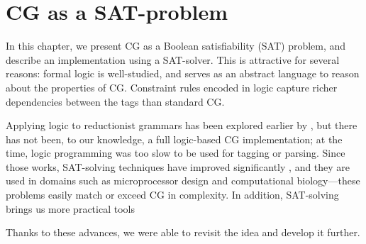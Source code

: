 \def\la{\text{\em la}}
\def\casa{\text{\em casa}}
\def\grande{\text{\em grande}}

\def\det{{\text{\sc Det}}}
\def\prn{{\text{\sc  Prn}}}
\def\n{{\text{\sc N}}}
\def\v{{\text{\sc V}}}
\def\adj{{\text{\sc Adj}}}

\def\laDet{\la_\det}
\def\laPrn{\la_\prn}
\def\casaN{\casa_\n}
\def\casaV{\casa_\v}
\def\grandeAdj{\grande_\adj}

\def\t#1{\texttt{#1}}
\def\ob#1{\overbrace{ #1 \rule{0pt}{2ex}}}
\def\cgrule#1{{\ttfamily #1}}

\def\defRule{``do not remove the last reading''}


\chapter{CG as a SAT-problem}
\label{chapterCGSAT}

In this chapter, we present CG as a Boolean satisfiability (SAT) problem,
and describe an implementation using a SAT-solver. 
This is attractive for several reasons: formal logic is
well-studied, and serves as an abstract language to reason about the
properties of CG. Constraint rules encoded in logic capture richer
dependencies between the tags than standard CG. 



Applying logic to reductionist grammars has been explored earlier by \cite{lager98,lager_nivre01}, but there has not been, to our knowledge, a full logic-based CG implementation; at the time, logic programming was too slow to be used for tagging or parsing. 
Since those works, SAT-solving techniques have improved significantly \cite{marques_silva2010}, and they are used in domains such as microprocessor design and computational 
biology---these problems easily match or exceed CG in complexity. 
In addition, SAT-solving brings us more practical tools

Thanks to these advances, we were able to revisit the idea and develop it further. 


